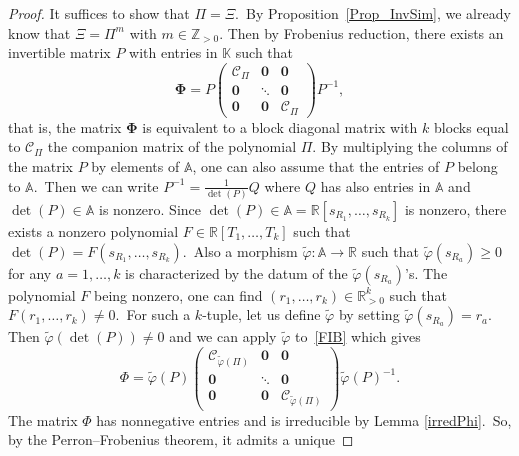\documentclass[ALCO,ThmDefs,Unicode,epreuves]{cedram}
\begin{document}
\begin{proof}
It suffices to show that $\Pi=\Xi$.\ By Proposition~\ref{Prop_InvSim}, we
already know that $\Xi=\Pi^{m}$ with $m\in\mathbb{Z}_{>0}$. Then by Frobenius
reduction, there exists an invertible matrix $P$ with entries in $\mathbb{K}$
such that
\begin{equation}
\boldsymbol{\Phi}=P\left(
\begin{matrix}
\mathcal{C}_{\Pi} & \boldsymbol{0} & \boldsymbol{0}\\
\boldsymbol{0} & \ddots & \boldsymbol{0}\\
\boldsymbol{0} & \boldsymbol{0} & \mathcal{C}_{\Pi}%
\end{matrix}
\right) P^{-1}, \label{FIB}%
\end{equation}
that is, the matrix $\boldsymbol{\Phi}$ is equivalent to a block diagonal
matrix with $k$ blocks equal to $\mathcal{C}_{\Pi}$ the companion matrix of
the polynomial $\Pi$. By multiplying the columns of the matrix $P$ by elements
of $\mathbb{A}$, one can also assume that the entries of $P$ belong to
$\mathbb{A}$.\ Then we can write $P^{-1}=\frac{1}{\det(P)}Q$ where $Q$ has
also entries in $\mathbb{A}$ and $\det(P)\in\mathbb{A}$ is nonzero. Since
$\det(P)\in\mathbb{A}=\mathbb{R}[s_{R_{1}},\ldots,s_{R_{k}}]$ is nonzero,
there exists a nonzero polynomial $F\in\mathbb{R}[T_{1},\ldots,T_{k}]$ such
that $\det(P)=F(s_{R_{1}},\ldots,s_{R_{k}})$.\ Also a morphism $\widetilde
{\varphi}:\mathbb{A}\rightarrow\mathbb{R}$ such that $\widetilde{\varphi
}(s_{R_{a}})\geq0$ for any $a=1,\ldots,k$ is characterized by the datum of the
$\widetilde{\varphi}(s_{R_{a}})$'s. The polynomial $F$ being nonzero, one can
find $(r_{1},\ldots,r_{k})\in\mathbb{R}_{>0}^{k}$ such that $F(r_{1}%
,\ldots,r_{k})\neq0$.\ For such a $k$-tuple, let us define $\widetilde
{\varphi}$ by setting $\widetilde{\varphi}(s_{R_{a}})=r_{a}$. Then
$\widetilde{\varphi}(\det(P))\neq0$ and we can apply $\widetilde{\varphi}$ to~\eqref{FIB} which gives%
\[
\Phi=\widetilde{\varphi}(P)\left(
\begin{matrix}
\mathcal{C}_{\widetilde{\varphi}(\Pi)} & \boldsymbol{0} & \boldsymbol{0}\\
\boldsymbol{0} & \ddots & \boldsymbol{0}\\
\boldsymbol{0} & \boldsymbol{0} & \mathcal{C}_{\widetilde{\varphi}(\Pi)}%
\end{matrix}
\right) \widetilde{\varphi}(P)^{-1}.
\]
The matrix $\Phi$ has nonnegative entries and is irreducible by Lemma
\ref{irredPhi}.\ So, by the Perron--Frobenius theorem, it admits a unique

\end{proof}
\end{document}
